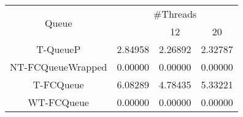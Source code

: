 \begin{tabular}{|c|c|c|c|}
\hline
\multirow{2}{*}{Queue} & \multicolumn{3}{c|}{\#Threads}\\\cline{2-4}& \quad 4 & 12 & 20\\
\hline
\hline
T-QueueP & 2.84958 & 2.26892 & 2.32787\\
NT-FCQueueWrapped & 0.00000 & 0.00000 & 0.00000\\
T-FCQueue & 6.08289 & 4.78435 & 5.33221\\
WT-FCQueue & 0.00000 & 0.00000 & 0.00000\\
\hline\end{tabular}
